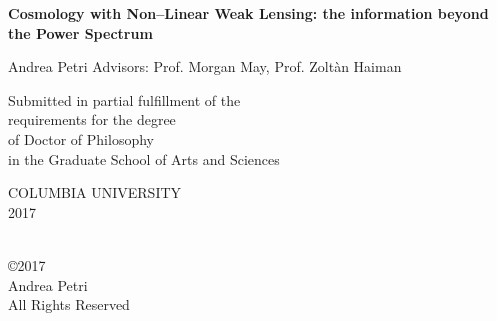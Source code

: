 \documentclass[12pt]{report}           %
\begin{document}

%






\thispagestyle{empty}


\def\thesistitle{Cosmology with Non--Linear Weak Lensing: the information beyond the Power Spectrum}


\pagestyle{empty}

\begin{center}

{\Large \bf \thesistitle}

\vskip1.5in

{\Large  Andrea Petri } %
\vskip0.5in
{\Large  Advisors: Prof. Morgan May, Prof. Zolt\`an Haiman } 



\vskip1.1in


\large
Submitted in partial fulfillment of the               \\
requirements for the degree                           \\
of Doctor of Philosophy                               \\
in the Graduate School of Arts and Sciences           \\

\vskip0.5in

COLUMBIA UNIVERSITY                                   \\
2017                                                  \\

\end{center}


\clearpage


\begin{center}
\ \\
\vskip5.5in
\copyright 2017 \\[3mm]
Andrea Petri\\
All Rights Reserved
\end{center}
\clearpage


\end{document}
